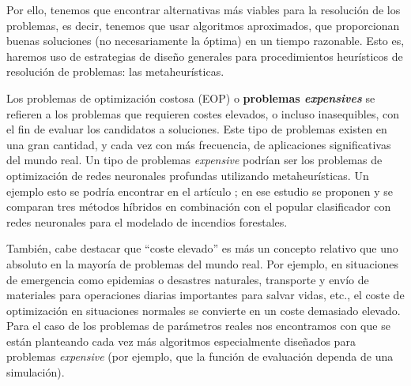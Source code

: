 Por ello, tenemos que encontrar alternativas más viables para la resolución de los problemas, es decir, tenemos que usar algoritmos aproximados, que proporcionan buenas soluciones (no necesariamente la óptima) en un tiempo razonable. 
Esto es, haremos uso de estrategias de diseño generales para procedimientos heurísticos de resolución de problemas: las metaheurísticas.

Los problemas de optimización costosa (EOP) o \textbf{problemas \textit{expensives}} se refieren a los problemas que requieren costes elevados, o incluso inasequibles, con el fin de evaluar los candidatos a soluciones. 
Este tipo de problemas existen en una gran cantidad, y cada vez con más frecuencia, de aplicaciones significativas del mundo real. 
Un tipo de problemas \textit{expensive} podrían ser los problemas de optimización de redes neuronales profundas utilizando metaheurísticas. 
Un ejemplo esto se podría encontrar en el artículo \parencite{buiMetaheuristicAlgorithmsOptimizing2019}; en ese estudio se proponen y se comparan tres métodos híbridos en combinación con el popular clasificador con redes neuronales para el modelado de incendios forestales.

También, cabe destacar que ``coste elevado'' es más un concepto relativo que uno absoluto en la mayoría de problemas del mundo real. 
Por ejemplo, en situaciones de emergencia como epidemias o desastres naturales, transporte y envío de materiales para operaciones diarias importantes para salvar vidas, etc., el coste de optimización en situaciones normales se convierte en un coste demasiado elevado. 
Para el caso de los problemas de parámetros reales nos encontramos con que se están planteando cada vez más algoritmos especialmente diseñados para problemas \textit{expensive} (por ejemplo, que la función de evaluación dependa de una simulación).

